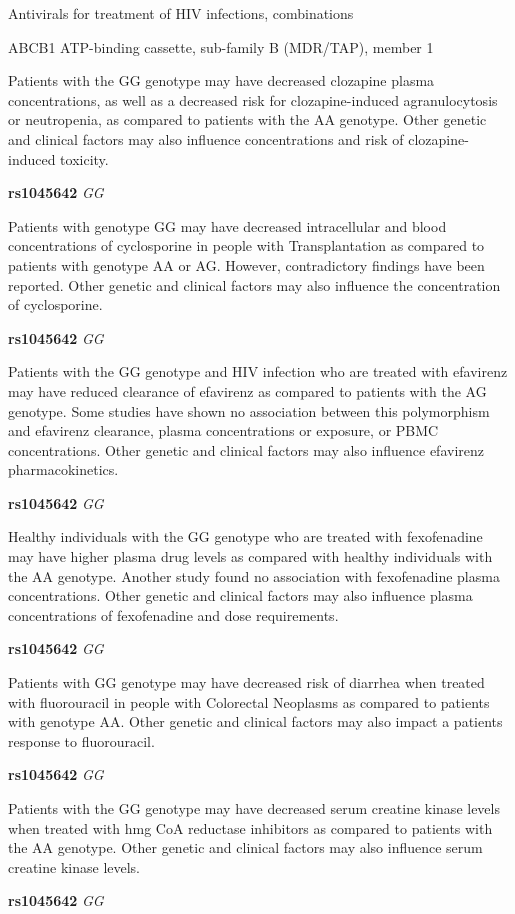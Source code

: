 \documentclass{resume} %
\begin{document}
\begin{rSection}{ Antivirals for treatment of HIV infections, combinations }
\begin{rSubsection}{ ABCB1 }{ ATP-binding cassette, sub-family B (MDR/TAP), member 1 }{}{}
\item[] Patients with the GG genotype may have decreased clozapine plasma concentrations, as well as a decreased risk for clozapine-induced agranulocytosis or neutropenia, as compared to patients with the AA genotype. Other genetic and clinical factors may also influence concentrations and risk of clozapine-induced toxicity. \item \textbf{ rs1045642 } \textit{ GG }
\item[] Patients with genotype GG may have decreased intracellular and blood concentrations of cyclosporine in people with Transplantation as compared to patients with genotype AA or AG. However, contradictory findings have been reported. Other genetic and clinical factors may also influence the concentration of cyclosporine.\item \textbf{ rs1045642 } \textit{ GG }
\item[] Patients with the GG genotype and HIV infection who are treated with efavirenz may have reduced clearance of efavirenz as compared to patients with the AG genotype. Some studies have shown no association between this polymorphism and efavirenz clearance, plasma concentrations or exposure, or PBMC concentrations. Other genetic and clinical factors may also influence efavirenz pharmacokinetics. \item \textbf{ rs1045642 } \textit{ GG }
\item[] Healthy individuals with the GG genotype who are treated with fexofenadine may have higher plasma drug levels as compared with healthy individuals with the AA genotype. Another study found no association with fexofenadine plasma concentrations. Other genetic and clinical factors may also influence plasma concentrations of fexofenadine and dose requirements.\item \textbf{ rs1045642 } \textit{ GG }
\item[] Patients with GG genotype may have decreased risk of diarrhea when treated with fluorouracil in people with Colorectal Neoplasms as compared to patients with genotype AA. Other genetic and clinical factors may also impact a patients response to fluorouracil.\item \textbf{ rs1045642 } \textit{ GG }
\item[] Patients with the GG genotype may have decreased serum creatine kinase levels when treated with hmg CoA reductase inhibitors as compared to patients with the AA genotype. Other genetic and clinical factors may also influence serum creatine kinase levels. \item \textbf{ rs1045642 } \textit{ GG }

\end{rSubsection}
\end{rSection}
\end{document}
